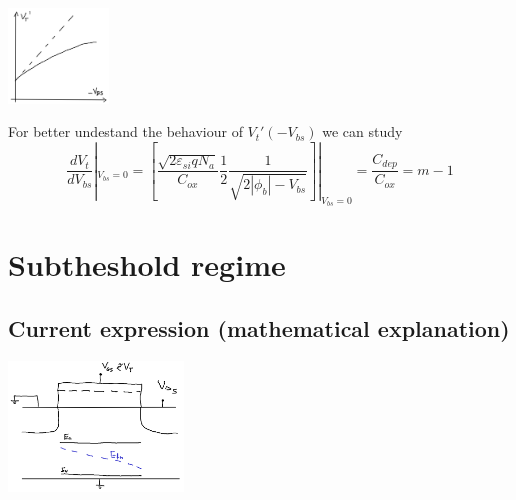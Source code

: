 \centering
\includegraphics[width=0.2\textwidth]{body3.png}\\
\raggedright

For better undestand the behaviour of $V_t'(-V_{bs})$ we can study 
\begin{equation}
\frac{d V_t}{dV_{bs}}|_{V_{bs}=0}=[\frac{\sqrt{2\varepsilon_{si}qN_a}}{C_{ox}}\frac{1}{2}\frac{1}{\sqrt{2|\phi_b|-V_{bs}}}]|_{V_{bs}=0}=\frac{C_{dep}}{C_{ox}}=m-1
\end{equation}

\section{Subtheshold regime}

\subsection{Current expression (mathematical explanation)}

\centering
\includegraphics[width=0.35\textwidth]{subth.png}\\
\raggedright

